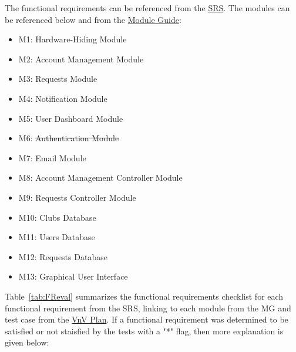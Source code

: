 \documentclass[12pt, titlepage]{article}
\begin{document}
The functional requirements can be referenced from the \href{https://github.com/ausbennett/mes-finance-platform/blob/main/docs/SRS/SRS.pdf}{SRS}. The modules can be referenced below and from the \href{https://github.com/ausbennett/mes-finance-platform/blob/main/docs/Design/SoftArchitecture/MG.pdf}{Module Guide}:

\begin{itemize}
    \item M1: Hardware-Hiding Module
    \item M2: Account Management Module
    \item M3: Requests Module
    \item M4: Notification Module
    \item M5: User Dashboard Module
    \item M6: \st{Authentication Module}
    \item M7: Email Module
    \item M8: Account Management Controller Module
    \item M9: Requests Controller Module
    \item M10: Clubs Database
    \item M11: Users Database
    \item M12: Requests Database
    \item M13: Graphical User Interface
\end{itemize}

Table~\ref{tab:FReval} summarizes the functional requirements checklist for each functional requirement from the SRS, linking to each module from the MG and test case from the \href{https://github.com/ausbennett/mes-finance-platform/blob/main/docs/VnVPlan/VnVPlan.pdf}{VnV Plan}. If a functional requirement was determined to be satisfied or not staisfied by the tests with a "*" flag, then more explanation is given below:
\end{document}
